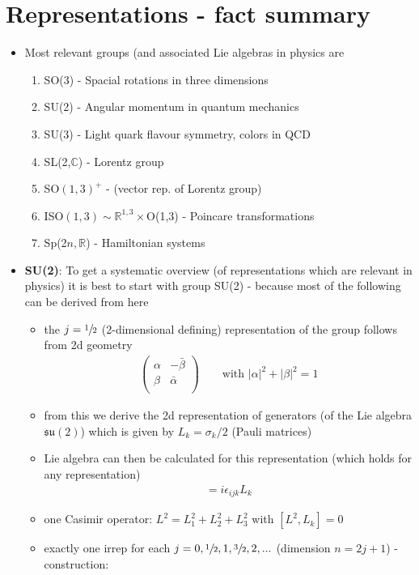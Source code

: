 \documentclass[10pt,a4paper]{report}
\theoremstyle{definition}
\begin{document}
\section{Representations - fact summary}
\begin{itemize}
\item Most relevant groups (and associated Lie algebras in physics are
\begin{enumerate}
\item SO(3) - Spacial rotations in three dimensions
\item SU(2) - Angular momentum in quantum mechanics
\item SU(3) - Light quark flavour symmetry, colors in QCD
\item SL(2,$\mathbb{C}$) - Lorentz group
\item SO$(1,3)^+$ - (vector rep. of Lorentz group)
\item ISO$(1,3)\sim\mathbb{R}^{1,3}\times$O(1,3) - Poincare transformations
\item Sp(2$n,\mathbb{R}$) - Hamiltonian systems
\end{enumerate}
\item {\bf SU(2)}: To get a systematic overview (of representations  which are relevant in physics) it is best to start with group SU(2) - because most of the following can be derived from here
\begin{itemize}
\item the $j=\sfrac{1}{2}$ (2-dimensional defining) representation of the group follows from 2d geometry
\begin{align}
\left(\begin{matrix}
\alpha & -\bar{\beta}\\
\beta & \bar{\alpha}\\
\end{matrix}\right)\qquad\text{with }|\alpha|^2+|\beta|^2=1
\end{align}
\item from this we derive the 2d representation of generators (of the Lie algebra $\mathfrak{su}(2)$) which is given by $L_k=\sigma_k/2$ (Pauli matrices)
\item Lie algebra can then be calculated for this representation (which holds for any representation) 
\begin{align}
[L_i,L_j]=i\epsilon_{ijk}L_k
\end{align}
\item one Casimir operator: $L^2=L_1^2+L_2^2+L_3^2$ with $[L^2,L_k]=0$
\item exactly one irrep for each $j=0,\sfrac{1}{2},1,\sfrac{3}{2},2,...$ (dimension $n=2j+1$) - construction:

\end{itemize}
\end{itemize}
\end{document}
